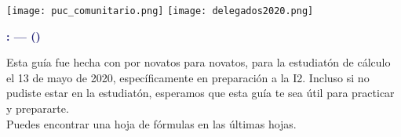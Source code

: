 
\begin{coverpages}
    \begin{flushleft}

        \texttt{[image: puc\_comunitario.png]}
        \texttt{[image: delegados2020.png]} \\ \vspace{10mm}

        \textcolor{MidnightBlue}{\textbf{\Large \codigoDelCurso{}: \elCurso{} --- \fecha{} (\nombreDocumento)}} \\[\baselineskip]
        \vspace{10mm}

        Esta guía fue hecha con {\emoji {}} por novatos para novatos, para la estudiatón de cálculo el 13 de mayo de 2020, específicamente en preparación a la I2. Incluso si no pudiste estar en la estudiatón, esperamos que esta guía te sea útil para practicar y prepararte.\\[\baselineskip]

        {Puedes encontrar una hoja de fórmulas en las últimas hojas.} %



        \vspace{25mm}



\end{flushleft}
\end{coverpages}
